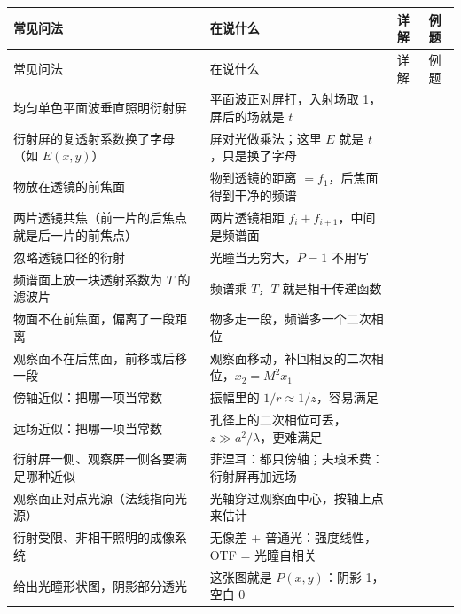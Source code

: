 {\footnotesize\setlength{\tabcolsep}{2.5pt}\renewcommand{\arraystretch}{1.22}
\begin{longtable}{@{}P{6.6cm}P{8.5cm}>{\raggedleft\arraybackslash}p{0.8cm}>{\raggedleft\arraybackslash}p{0.8cm}@{}}
\toprule
常见问法 & 在说什么 & 详解 & 例题\\ \midrule
\endfirsthead
\toprule
常见问法 & 在说什么 & 详解 & 例题\\ \midrule
\endhead
\bottomrule
\endfoot
均匀单色平面波垂直照明衍射屏 & 平面波正对屏打，入射场取 1，屏后的场就是 $t$ & \pageref{sec:screens} & \pageref{ex:v-4f2}\\
衍射屏的复透射系数换了字母（如 $E(x,y)$） & 屏对光做乘法；这里 $E$ 就是 $t$，只是换了字母 & \pageref{sec:screens} & \pageref{ex:v-4f2}\\
物放在透镜的前焦面 & 物到透镜的距离 $=f_1$，后焦面得到干净的频谱 & \pageref{sec:lensFT} & \pageref{ex:v-4f2}\\
两片透镜共焦（前一片的后焦点就是后一片的前焦点） & 两片透镜相距 $f_i+f_{i+1}$，中间是频谱面 & \pageref{sec:4f} & \pageref{ex:v-4f2}\\
忽略透镜口径的衍射 & 光瞳当无穷大，$P=1$ 不用写 & \pageref{sec:4fderiv} & \pageref{ex:v-4f2}\\
频谱面上放一块透射系数为 $T$ 的滤波片 & 频谱乘 $T$，$T$ 就是相干传递函数 & \pageref{sec:4fctf} & \pageref{ex:v-4f2}\\
物面不在前焦面，偏离了一段距离 & 物多走一段，频谱多一个二次相位 & \pageref{sec:4foffset} & \pageref{ex:v-4fshift}\\
观察面不在后焦面，前移或后移一段 & 观察面移动，补回相反的二次相位，$x_2=M^2x_1$ & \pageref{sec:4foffset} & \pageref{ex:v-4fshift}\\
傍轴近似：把哪一项当常数 & 振幅里的 $1/r\approx1/z$，容易满足 & \pageref{box:approx} & \pageref{ex:v-approx}\\
远场近似：把哪一项当常数 & 孔径上的二次相位可丢，$z\gg a^2/\lambda$，更难满足 & \pageref{box:approx} & \pageref{ex:v-approx}\\
衍射屏一侧、观察屏一侧各要满足哪种近似 & 菲涅耳：都只傍轴；夫琅禾费：衍射屏再加远场 & \pageref{box:approx} & \pageref{ex:v-approx}\\
观察面正对点光源（法线指向光源） & 光轴穿过观察面中心，按轴上点来估计 & \pageref{box:approx} & \pageref{ex:v-approx}\\
衍射受限、非相干照明的成像系统 & 无像差 + 普通光：强度线性，OTF = 光瞳自相关 & \pageref{sec:typeB} & \pageref{ex:v-3slit}\\
给出光瞳形状图，阴影部分透光 & 这张图就是 $P(x,y)$：阴影 1，空白 0 & \pageref{rcp:readfig} & \pageref{ex:v-3slit}\\

\end{longtable}}
